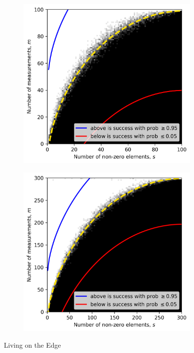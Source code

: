 \begin{figure}
    \begin{subfigure}{0.5\textwidth}
            \includegraphics[width=\linewidth]{pictures/lote_estimates}
        \caption{}
    \end{subfigure}
    \begin{subfigure}{0.5\textwidth}
            \includegraphics[width=\linewidth]{pictures/lote_estimates_d300}
        \caption{}
    \end{subfigure}

    \caption{Living on the Edge}
    \label{fig:lote}
\end{figure}

